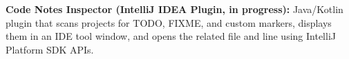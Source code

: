 
\textbf{Code Notes Inspector (IntelliJ IDEA Plugin, in progress):} Java/Kotlin plugin that scans projects for TODO, FIXME, and custom markers, displays them in an IDE tool window, and opens the related file and line using IntelliJ Platform SDK APIs.

